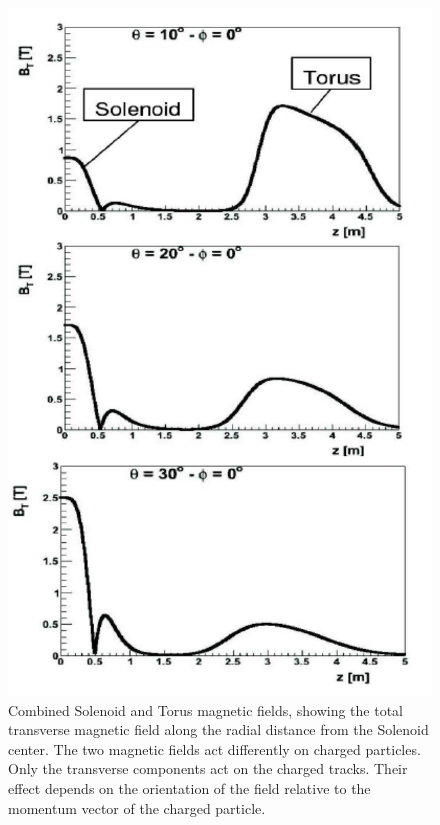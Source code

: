 \documentclass[final,3p,twocolumn]{elsarticle}
\begin{document}
\begin{figure}[htbp!]
\centerline{\includegraphics[width=1.0\columnwidth]{magfield.png}}
\caption{Combined Solenoid and Torus magnetic fields, showing the total transverse magnetic field along the radial
distance from the Solenoid center. The two magnetic fields act differently on charged particles. Only the transverse
components act on the charged tracks. Their effect depends on the orientation of the field relative to the momentum
vector of the charged particle.} 
\label{solenoid-torus}
\end{figure}
\end{document}
